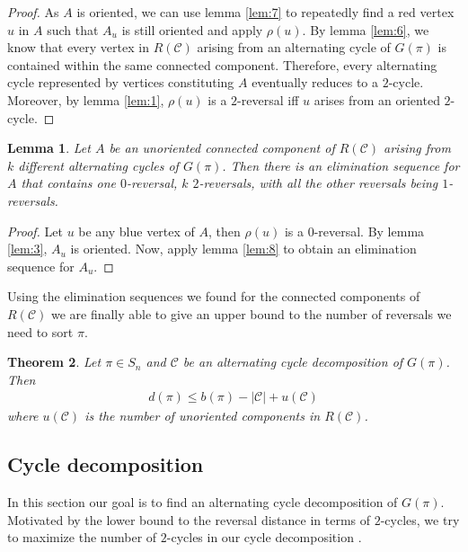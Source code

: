 \documentclass[11pt,DIV=11]{scrartcl}
\newtheorem{theorem}{Theorem}[section]
\newtheorem{lemma}[theorem]{Lemma}
\theoremstyle{definition}
\theoremstyle{remark}
\begin{document}
\begin{proof}
As $A$ is oriented, we can use lemma \ref{lem:7} to repeatedly find a red vertex $u$ in $A$ such that $A_u$ is still oriented and apply $\rho(u)$.
By lemma \ref{lem:6}, we know that every vertex in $R(\mathcal{C})$ arising from an alternating cycle of $G(\pi)$ is contained within the same connected component. Therefore, every alternating cycle represented by vertices constituting $A$ eventually reduces to a $2$-cycle. Moreover, by lemma \ref{lem:1}, $\rho(u)$ is a $2$-reversal iff $u$ arises from an oriented $2$-cycle.

\end{proof}

\begin{lemma}
\label{lem:9}
Let $A$ be an unoriented connected component of $R(\mathcal{C})$ arising from $k$ different alternating cycles of $G(\pi)$. Then there is an elimination sequence for $A$ that contains one $0$-reversal, $k$ $2$-reversals, with all the other reversals being $1$-reversals.
\end{lemma}

\begin{proof}
Let $u$ be any blue vertex of $A$, then $\rho(u)$ is a $0$-reversal. By lemma \ref{lem:3}, $A_u$ is oriented.
Now, apply lemma \ref{lem:8} to obtain an elimination sequence for $A_u$.
\end{proof}

Using the elimination sequences we found for the connected components of $R(\mathcal{C})$ we are finally able to give an upper bound to the number of reversals we need to sort $\pi$.

\begin{theorem}
\label{thm:4}
Let $\pi \in S_n$ and $\mathcal{C}$ be an alternating cycle decomposition of $G(\pi)$. Then
\begin{align*}
    d(\pi) \leq b(\pi) - |\mathcal{C}| + u(\mathcal{C})
\end{align*}
where $u(\mathcal{C})$ is the number of unoriented components in $R(\mathcal{C})$.
\end{theorem}

\subsection{Cycle decomposition}
\label{sec:cycle_decomposition}

In this section our goal is to find an alternating cycle decomposition of $G(\pi)$. Motivated by the lower bound to the reversal distance in terms of $2$-cycles, we try to maximize the number of $2$-cycles in our cycle decomposition \cite{Christie1998}.
\end{document}
